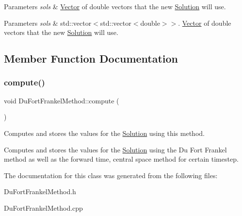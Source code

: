 \begin{DoxyParams}{Parameters}
{\em sols} & \hyperlink{class_vector}{Vector} of double vectors that the new \hyperlink{class_solution}{Solution} will use. \\
\hline
\end{DoxyParams}

\begin{DoxyParams}{Parameters}
{\em sols} & std\+::vector$<$std\+::vector$<$double$>$$>$. \hyperlink{class_vector}{Vector} of double vectors that the new \hyperlink{class_solution}{Solution} will use. \\
\hline
\end{DoxyParams}


\subsection{Member Function Documentation}
\mbox{\label{class_du_fort_frankel_method_a68b9ad88883a71daba4c2fc92355b173}} 
\subsubsection{\texorpdfstring{compute()}{compute()}}
{\footnotesize\ttfamily void Du\+Fort\+Frankel\+Method\+::compute (\begin{DoxyParamCaption}{ }\end{DoxyParamCaption})}

Computes and stores the values for the \hyperlink{class_solution}{Solution} using this method.

Computes and stores the values for the \hyperlink{class_solution}{Solution} using the Du Fort Frankel method as well as the forward time, central space method for certain timestep. 

The documentation for this class was generated from the following files\+:\begin{DoxyCompactItemize}
\item 
Du\+Fort\+Frankel\+Method.\+h\item 
Du\+Fort\+Frankel\+Method.\+cpp\end{DoxyCompactItemize}

